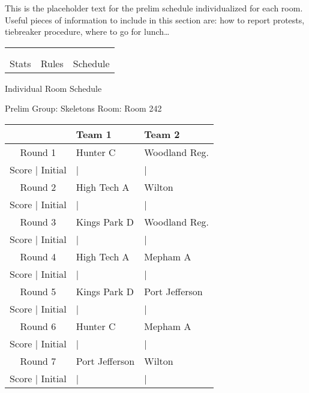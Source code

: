 \documentclass{article}%
\begin{document}
\vspace*{16pt}%
\linebreak%
This is the placeholder text for the prelim schedule individualized for each room. Useful pieces of information to include in this section are: how to report protests, tiebreaker procedure, where to go for lunch…%
\vspace*{30pt}%
\newline%
%
\begin{tabularx}{\textwidth}{YYY}%
  &  &  \\%
\\%
Stats&Rules&Schedule\\%
\end{tabularx}%
\newpage%
\begin{center}%
\begin{Huge}%
Individual Room Schedule%
\end{Huge}%
\vspace*{16pt}%
\linebreak%
\begin{Large}%
Prelim Group: Skeletons \hfill Room: Room 242%
\end{Large}%
\end{center}%
%
\begin{tabularx}{\textwidth}{|c|Y|Y|}%
\hline%
&Team 1&Team 2\\%
\hline%
Round 1&Hunter C&Woodland Reg.\\%
\hline%
Score | Initial&|&|\\%
\hline%
Round 2&High Tech A&Wilton\\%
\hline%
Score | Initial&|&|\\%
\hline%
Round 3&Kings Park D&Woodland Reg.\\%
\hline%
Score | Initial&|&|\\%
\hline%
Round 4&High Tech A&Mepham A\\%
\hline%
Score | Initial&|&|\\%
\hline%
Round 5&Kings Park D&Port Jefferson\\%
\hline%
Score | Initial&|&|\\%
\hline%
Round 6&Hunter C&Mepham A\\%
\hline%
Score | Initial&|&|\\%
\hline%
Round 7&Port Jefferson&Wilton\\%
\hline%
Score | Initial&|&|\\%
\hline%
\end{tabularx}%
\end{document}
